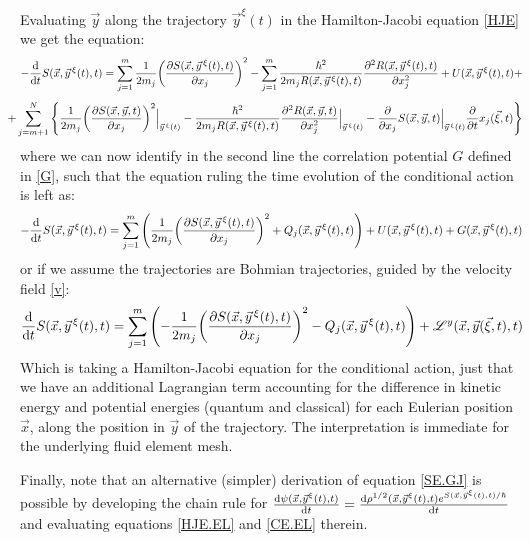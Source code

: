 \documentclass[11pt, a4paper]{article} %
\newcommand{\Lg}{\mathscr{L}}
\begin{document}
Evaluating $\vec{y}$ along the trajectory $\vec{y}^\xi(t)$ in the Hamilton-Jacobi equation \eqref{HJE} we get the equation:
\begin{equation}
-\dv{}{t}S(\vec{x}, \vec{y}^{\, \xi}(t),t)=\sum_{j=1}^m\frac{1}{2m_j}\qty(\pdv{S(\vec{x},\vec{y}^{\, \xi}(t),t)}{x_j})^2-\sum_{j=1}^m \frac{\hbar^2}{2m_jR(\vec{x},\vec{y}^{\, \xi}(t),t)}\pdv[2]{R(\vec{x},\vec{y}^{\, \xi}(t),t)}{x_j}+U(\vec{x},\vec{y}^{\, \xi}(t),t)+\vspace{-0.1cm}
\end{equation}
$$
\hspace{-0.4cm} +\sum_{j=m+1}^N\qty{\frac{1}{2m_j}\qty(\pdv{S(\vec{x},\vec{y},t)}{x_j})^2\Big\rvert_{\vec{y}^{\, \xi}(t)}-\frac{\hbar^2}{2m_jR(\vec{x},\vec{y}^{\, \xi}(t),t)}\pdv[2]{R(\vec{x},\vec{y},t)}{x_j}\Big\rvert_{\vec{y}^{\, \xi}(t)}-\pdv{}{x_j}S(\vec{x},\vec{y},t)\Big\rvert_{\vec{y}^{\, \xi}(t)}\pdv{}{t}x_j(\vec{\xi},t)}
$$
where we can now identify in the second line the correlation potential $G$ defined in \eqref{G}, such that the equation ruling the time evolution of the conditional action is left as:
\begin{equation}\label{HJE.EL}
-\dv{}{t}S(\vec{x}, \vec{y}^{\, \xi}(t),t)=\sum_{j=1}^m\qty(\frac{1}{2m_j}\qty(\pdv{S(\vec{x},\vec{y}^{\, \xi}(t),t)}{x_j})^2+Q_j(\vec{x},\vec{y}^{\, \xi}(t),t))+U(\vec{x},\vec{y}^{\, \xi}(t),t)+G(\vec{x},\vec{y}^{\, \xi}(t),t)\vspace{-0.1cm}
\end{equation}
or if we assume the trajectories are Bohmian trajectories, guided by the velocity field \eqref{v}:
\begin{equation}\label{HJE.EL.Bohm}
\dv{}{t}S(\vec{x}, \vec{y}^{\, \xi}(t),t)=\sum_{j=1}^m\qty(-\frac{1}{2m_j}\qty(\pdv{S(\vec{x},\vec{y}^{\, \xi}(t),t)}{x_j})^2-Q_j(\vec{x},\vec{y}^{\, \xi}(t),t))+\Lg^y(\vec{x},\vec{y}(\vec{\xi},t),t) 
\end{equation}
Which is taking a Hamilton-Jacobi equation for the conditional action, just that we have an additional Lagrangian term accounting for the difference in kinetic energy and potential energies (quantum and classical) for each Eulerian position $\vec{x}$, along the position in $\vec{y}$ of the trajectory. The interpretation is immediate for the underlying fluid element mesh.

Finally, note that an alternative (simpler) derivation of equation \eqref{SE.GJ} is possible by developing the chain rule for $\dv{\psi(\vec{x},\vec{y}^\xi(t),t)}{t}=\dv{\rho^{1/2}(\vec{x},\vec{y}^\xi(t),t)e^{S(\vec{x},\vec{y}^\xi(t),t)/\hbar}}{t}$ and evaluating equations \eqref{HJE.EL} and \eqref{CE.EL} therein.
\end{document}
